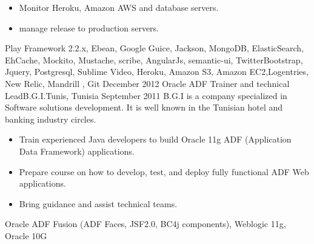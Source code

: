 \begin{experiences}
{\begin{itemize}
                        \item Monitor Heroku, Amazon AWS and database servers.
                        \item manage release to production servers.
                      \end{itemize}
                    }
                    {Play Framework 2.2.x, Ebean, Google Guice, Jackson, MongoDB, ElasticSearch, EhCache, Mockito, Mustache, scribe, AngularJs, semantic-ui, TwitterBootstrap, Jquery, Postgresql, Sublime Video, Heroku, Amazon S3, Amazon EC2,Logentries, New Relic, Mandrill , Git}
  \emptySeparator
  \experience
    {December 2012}   {Oracle ADF Trainer and technical Lead}{B.G.I.}{Tunis, Tunisia}
    {September 2011} {B.G.I is a company specialized in Software solutions development. It is well known in the Tunisian hotel and banking industry circles.}
                    {
                      \begin{itemize}
                        \item Train experienced Java developers to build Oracle 11g ADF (Application Data Framework) applications.
                        \item Prepare course on how to develop, test, and deploy fully functional ADF Web applications.
                        \item Bring guidance and assist technical teams.
                      \end{itemize}
                    }
                    {Oracle ADF Fusion (ADF Faces, JSF2.0, BC4j components), Weblogic 11g, Oracle 10G}
  \emptySeparator
\end{experiences}
